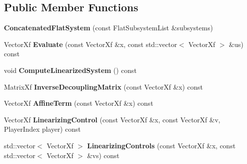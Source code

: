 \subsection*{Public Member Functions}
\begin{DoxyCompactItemize}
\item 
{\bfseries Concatenated\+Flat\+System} (const Flat\+Subsystem\+List \&subsystems)\hypertarget{classilqgames_1_1_concatenated_flat_system_ab0efbf94aae2b6a62c1ff2e42edbf590}{}\label{classilqgames_1_1_concatenated_flat_system_ab0efbf94aae2b6a62c1ff2e42edbf590}

\item 
Vector\+Xf {\bfseries Evaluate} (const Vector\+Xf \&x, const std\+::vector$<$ Vector\+Xf $>$ \&us) const \hypertarget{classilqgames_1_1_concatenated_flat_system_aa66c46c672ba365b02abb639feff4320}{}\label{classilqgames_1_1_concatenated_flat_system_aa66c46c672ba365b02abb639feff4320}

\item 
void {\bfseries Compute\+Linearized\+System} () const \hypertarget{classilqgames_1_1_concatenated_flat_system_a61ec103cf78e138c7c91b98af0d922ee}{}\label{classilqgames_1_1_concatenated_flat_system_a61ec103cf78e138c7c91b98af0d922ee}

\item 
Matrix\+Xf {\bfseries Inverse\+Decoupling\+Matrix} (const Vector\+Xf \&x) const \hypertarget{classilqgames_1_1_concatenated_flat_system_a1ddfbabea2c6a2f58d013ee4d919cb31}{}\label{classilqgames_1_1_concatenated_flat_system_a1ddfbabea2c6a2f58d013ee4d919cb31}

\item 
Vector\+Xf {\bfseries Affine\+Term} (const Vector\+Xf \&x) const \hypertarget{classilqgames_1_1_concatenated_flat_system_a4cd24cf9e78380c9752bfd398dd524c3}{}\label{classilqgames_1_1_concatenated_flat_system_a4cd24cf9e78380c9752bfd398dd524c3}

\item 
Vector\+Xf {\bfseries Linearizing\+Control} (const Vector\+Xf \&x, const Vector\+Xf \&v, Player\+Index player) const \hypertarget{classilqgames_1_1_concatenated_flat_system_a396cef9dc50fb39896f917b33681310a}{}\label{classilqgames_1_1_concatenated_flat_system_a396cef9dc50fb39896f917b33681310a}

\item 
std\+::vector$<$ Vector\+Xf $>$ {\bfseries Linearizing\+Controls} (const Vector\+Xf \&x, const std\+::vector$<$ Vector\+Xf $>$ \&vs) const \hypertarget{classilqgames_1_1_concatenated_flat_system_a1bd90fe0f1198f7934d478f0c17db1d4}{}\label{classilqgames_1_1_concatenated_flat_system_a1bd90fe0f1198f7934d478f0c17db1d4}


\end{DoxyCompactItemize}
